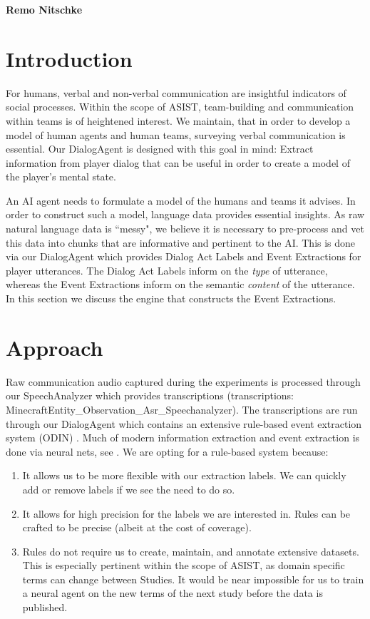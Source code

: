 \label{ch:rule_based_ie}
\textbf{Remo Nitschke}

\section{Introduction}

For humans, verbal and non-verbal communication are insightful indicators of
social processes. Within the scope of ASIST, team-building and communication
within teams is of heightened interest. We maintain, that in order to develop a
model of human agents and human teams, surveying verbal communication is
essential. Our DialogAgent is designed with this goal in mind: Extract
information from player dialog that can be useful in order to create a model of
the player's mental state.

An AI agent needs to formulate a model of the humans and teams it advises. In
order to construct such a model, language data provides essential insights. As
raw natural language data is ``messy", we believe it is necessary to
pre-process and vet this data into chunks that are informative and pertinent to
the AI. This is done via our DialogAgent which provides Dialog Act Labels and
Event Extractions for player utterances. The Dialog Act Labels inform on the
\emph{type} of utterance, whereas the Event Extractions inform on the semantic
\emph{content} of the utterance. In this section we discuss the engine that
constructs the Event Extractions.

\section{Approach}


Raw communication audio captured during the experiments is processed through
our SpeechAnalyzer which provides transcriptions (transcriptions:
MinecraftEntity\_Observation\_Asr\_Speechanalyzer). The transcriptions are run through our DialogAgent which contains an extensive rule-based event extraction system (ODIN) \citep{valenzuela-escarcega-etal-2016-odins}. Much of modern information extraction and event extraction is done via neural nets, see \citet{Ahmad2021GATEGA,Du2020EventEB}. We are opting for a rule-based system because:

\begin{enumerate}
 \item It allows us to be more flexible with our extraction labels. We can quickly add or remove labels if we see the need to do so.
 \item It allows for high precision for the labels we are interested in. Rules can be crafted to be precise (albeit at the cost of coverage).
 \item Rules do not require us to create, maintain, and annotate extensive datasets. This is especially pertinent within the scope of ASIST, as domain specific terms can change between Studies. It would be near impossible for us to train a neural agent on the new terms of the next study before the data is published.
\end{enumerate}

